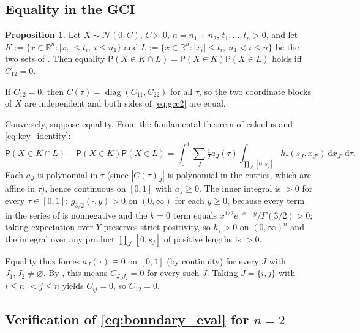 \documentclass[12pt,a4paper]{article}
\makeatletter
\theoremstyle{definition}
\newtheorem{proposition}[theorem]{Proposition}
\renewenvironment{proof}[1][\proofname]{\par
  \pushQED{\qed}%
  \normalfont \topsep6\p@\@plus6\p@\relax
  \trivlist
  \item[\hskip\labelsep\bfseries #1\@addpunct{.}]\ignorespaces
}{%
  \popQED\endtrivlist\@endpefalse
}
\newcommand{\R}{\mathbb{R}}
\newcommand{\PP}{\mathsf{P}}
\newcommand{\diag}{\operatorname{diag}}
\newcommand{\dd}{\mathrm{d}}
\newcommand{\caln}{\mathcal{N}}
\makeatother
\begin{document}
\subsection{Equality in the GCI}\label{note:equality}

\begin{proposition}\label{prop:equality}
  Let $X\sim\caln(0,C)$, $C\succ 0$, $n=n_1+n_2$, $t_1,\ldots,t_n>0$, and
  let $K:=\{x\in\R^n:|x_i|\leqslant t_i,\ i\leqslant n_1\}$ and
  $L:=\{x\in\R^n:|x_i|\leqslant t_i,\ n_1<i\leqslant n\}$ be the two
  sets of .  Then equality
  $\PP(X\in K\cap L)=\PP(X\in K)\PP(X\in L)$ holds iff $C_{12}=0$.
\end{proposition}

\begin{proof}
  If $C_{12}=0$, then $C(\tau)=\diag(C_{11},C_{22})$ for all $\tau$,
  so the two coordinate blocks of $X$ are independent and both sides
  of \eqref{eq:gcc2} are equal.

  Conversely, suppose equality.  From the fundamental theorem of
  calculus and \eqref{eq:key_identity}:
  \[
    \PP(X\in K\cap L)-\PP(X\in K)\PP(X\in L)
    =\int_0^1\!\!\sum_{J}\tfrac{1}{2}a_J(\tau)
    \int_{\prod_{J^c}[0,s_j]}h_\tau(s_J,x_{J^c})\,\dd x_{J^c}\,\dd\tau.
  \]
  Each $a_J$ is polynomial in $\tau$ (since $|C(\tau)_J|$ is
  polynomial in the entries, which are affine in $\tau$), hence
  continuous on $[0,1]$ with $a_J\geqslant 0$.  The inner integral is $>0$
  for every $\tau\in[0,1]$: $g_{3/2}(\cdot,y)>0$ on $(0,\infty)$ for
  each $y\geqslant 0$, because every term in the series of
   is nonnegative and the $k=0$ term equals
  $x^{1/2}e^{-x-y}/\Gamma(3/2)>0$; taking expectation over $Y$
  preserves strict positivity, so $h_\tau>0$ on $(0,\infty)^n$ and the
  integral over any product $\prod_{J^c}[0,s_j]$ of positive lengths
  is $>0$.

  Equality thus forces $a_J(\tau)\equiv 0$ on $[0,1]$ (by continuity)
  for every $J$ with $J_1,J_2\ne\varnothing$.  By ,
  this means $C_{J_1J_2}=0$ for every such $J$.  Taking $J=\{i,j\}$
  with $i\leqslant n_1<j\leqslant n$ yields $C_{ij}=0$, so $C_{12}=0$.
\end{proof}

\subsection{Verification of \texorpdfstring{\eqref{eq:boundary_eval} for $n=2$}{the boundary evaluation for n=2}}
  \label{note:boundary}
\end{document}
